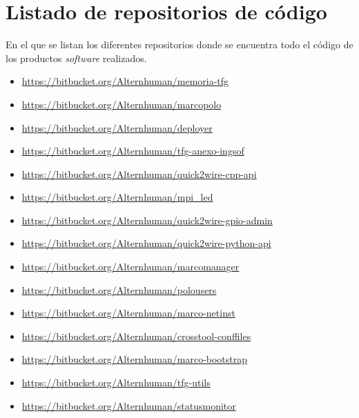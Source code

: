 \chapter{Listado de repositorios de código}
\label{repositorios}
\begin{elements}
En el que se listan los diferentes repositorios donde se encuentra todo el código de los productos \textit{software} realizados.
\end{elements}

\begin{itemize}
\item \href{https://bitbucket.org/Alternhuman/memoria-tfg}{https://bitbucket.org/Alternhuman/memoria-tfg}
\item \href{https://bitbucket.org/Alternhuman/marcopolo}{https://bitbucket.org/Alternhuman/marcopolo}
\item \href{https://bitbucket.org/Alternhuman/deployer}{https://bitbucket.org/Alternhuman/deployer}
\item \href{https://bitbucket.org/Alternhuman/tfg-anexo-ingsof}{https://bitbucket.org/Alternhuman/tfg-anexo-ingsof}
\item \href{https://bitbucket.org/Alternhuman/quick2wire-cpp-api}{https://bitbucket.org/Alternhuman/quick2wire-cpp-api}
\item \href{https://bitbucket.org/Alternhuman/mpi_led}{https://bitbucket.org/Alternhuman/mpi\_led}
\item \href{https://bitbucket.org/Alternhuman/quick2wire-gpio-admin}{https://bitbucket.org/Alternhuman/quick2wire-gpio-admin}
\item \href{https://bitbucket.org/Alternhuman/quick2wire-python-api}{https://bitbucket.org/Alternhuman/quick2wire-python-api} %
\item \href{https://bitbucket.org/Alternhuman/marcomanager}{https://bitbucket.org/Alternhuman/marcomanager}
\item \href{https://bitbucket.org/Alternhuman/polousers}{https://bitbucket.org/Alternhuman/polousers}
\item \href{https://bitbucket.org/Alternhuman/marco-netinst}{https://bitbucket.org/Alternhuman/marco-netinst}
\item \href{https://bitbucket.org/Alternhuman/crosstool-conffiles}{https://bitbucket.org/Alternhuman/crosstool-conffiles}
\item \href{https://bitbucket.org/Alternhuman/marco-bootstrap}{https://bitbucket.org/Alternhuman/marco-bootstrap}
\item \href{https://bitbucket.org/Alternhuman/tfg-utils}{https://bitbucket.org/Alternhuman/tfg-utils}
\item \href{https://bitbucket.org/Alternhuman/statusmonitor}{https://bitbucket.org/Alternhuman/statusmonitor}
\end{itemize}

